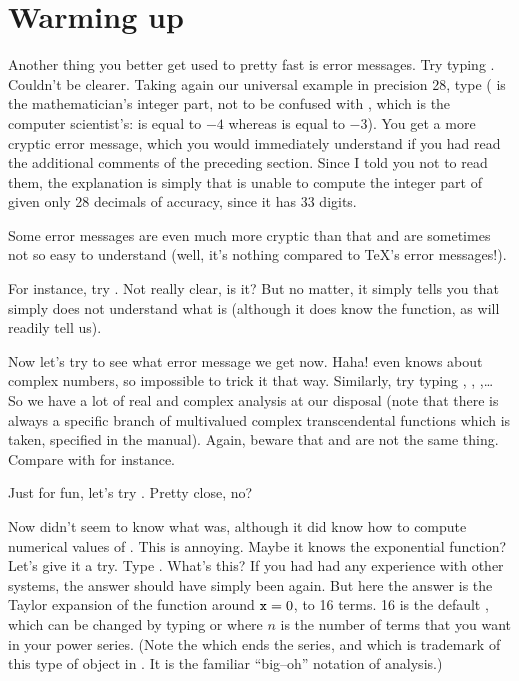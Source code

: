 \section{Warming up}

Another thing you better get used to pretty fast is error messages. Try
typing . Couldn't be clearer. Taking again our universal example in
precision 28, type  ( is the
mathematician's integer part, not to be confused with , which is
the computer scientist's:  is equal to $-4$ whereas
 is equal to $-3$).  You get a more cryptic error message,
which you would immediately understand if you had read the additional
comments of the preceding section. Since I told you not to read them, the
explanation is simply that  is unable to compute the integer part of
 given only 28 decimals of accuracy, since it has 33 digits.

Some error messages are even much more cryptic than that and are sometimes
not so easy to understand (well, it's nothing compared to \TeX's error
messages!).

For instance, try . Not really clear, is it? But no matter, it
simply tells you that  simply does not understand what  is
(although it does know the  function, as  will readily
tell us).

Now let's try  to see what error message we get now. Haha!
even knows about complex numbers, so impossible to trick it that way.
Similarly, try typing , , ,\dots
So we have a lot of real and complex analysis at our disposal (note that
there is always a specific branch of multivalued complex transcendental
functions which is taken, specified in the manual). Again, beware that
 and  are not the same thing. Compare  with
 for instance.

Just for fun, let's try . Pretty close, no?

\medskip
Now  didn't seem to know what  was, although it did know how to
compute numerical values of . This is annoying. Maybe it knows the
exponential function? Let's give it a try. Type . What's this? If
you had had any experience with other systems, the answer should have simply
been  again. But here the answer is the Taylor expansion of the
function around ${\tt x}=0$, to 16 terms. 16 is the default
, which can be changed by typing  or
 where $n$ is the number of terms that you
want in your power series. (Note the  which ends the series,
and which is trademark of this type of object in . It is the familiar
``big--oh'' notation of analysis.)

